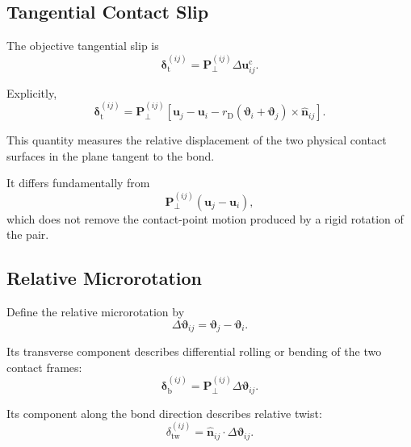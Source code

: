\subsection{Tangential Contact Slip}

The objective tangential slip is
\begin{equation}
    \boxed{ \boldsymbol{\delta}_{\mathrm{t}}^{(ij)} = \mathbf{P}_{\perp}^{(ij)} \Delta\mathbf{u}_{ij}^{\mathrm{c}} }.
\end{equation}

Explicitly,
\begin{equation}
    \boxed{ \boldsymbol{\delta}_{\mathrm{t}}^{(ij)} = \mathbf{P}_{\perp}^{(ij)} \left[ \mathbf{u}_j - \mathbf{u}_i - r_{\mathrm{D}} \left( \boldsymbol{\vartheta}_i + \boldsymbol{\vartheta}_j \right) \times \hat{\mathbf{n}}_{ij} \right] }.
\end{equation}

This quantity measures the relative displacement of the two physical contact surfaces in the plane tangent to the bond.

It differs fundamentally from
\begin{equation}
    \mathbf{P}_{\perp}^{(ij)} \left( \mathbf{u}_j - \mathbf{u}_i \right),
\end{equation}
which does not remove the contact-point motion produced by a rigid rotation of the pair.

\subsection{Relative Microrotation}

Define the relative microrotation by
\begin{equation}
    \Delta\boldsymbol{\vartheta}_{ij} = \boldsymbol{\vartheta}_j - \boldsymbol{\vartheta}_i.
\end{equation}

Its transverse component describes differential rolling or bending of the two contact frames:
\begin{equation}
    \boxed{ \boldsymbol{\delta}_{\mathrm{b}}^{(ij)} = \mathbf{P}_{\perp}^{(ij)} \Delta\boldsymbol{\vartheta}_{ij} }.
\end{equation}

Its component along the bond direction describes relative twist:
\begin{equation}
    \boxed{ \delta_{\mathrm{tw}}^{(ij)} = \hat{\mathbf{n}}_{ij} \cdot \Delta\boldsymbol{\vartheta}_{ij} }.
\end{equation}

